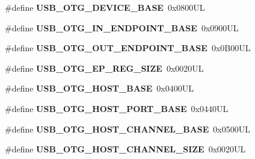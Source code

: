 \begin{DoxyCompactItemize}
\mbox{\label{group___peripheral__memory__map_ga4d74a337597a77b1fca978202b519a18}} 
\#define {\bfseries U\+S\+B\+\_\+\+O\+T\+G\+\_\+\+D\+E\+V\+I\+C\+E\+\_\+\+B\+A\+SE}~0x0800\+UL
\item 
\mbox{\label{group___peripheral__memory__map_gad8f69041452615aeb3948600e3882246}} 
\#define {\bfseries U\+S\+B\+\_\+\+O\+T\+G\+\_\+\+I\+N\+\_\+\+E\+N\+D\+P\+O\+I\+N\+T\+\_\+\+B\+A\+SE}~0x0900\+UL
\item 
\mbox{\label{group___peripheral__memory__map_gaf0e972b8f028ecf44a652029efbd4642}} 
\#define {\bfseries U\+S\+B\+\_\+\+O\+T\+G\+\_\+\+O\+U\+T\+\_\+\+E\+N\+D\+P\+O\+I\+N\+T\+\_\+\+B\+A\+SE}~0x0\+B00\+UL
\item 
\mbox{\label{group___peripheral__memory__map_ga6fdb7429ad88e2d69440d6ecc4f4199e}} 
\#define {\bfseries U\+S\+B\+\_\+\+O\+T\+G\+\_\+\+E\+P\+\_\+\+R\+E\+G\+\_\+\+S\+I\+ZE}~0x0020\+UL
\item 
\mbox{\label{group___peripheral__memory__map_ga3bb2dd6c82eefd8587b6146ba36ae071}} 
\#define {\bfseries U\+S\+B\+\_\+\+O\+T\+G\+\_\+\+H\+O\+S\+T\+\_\+\+B\+A\+SE}~0x0400\+UL
\item 
\mbox{\label{group___peripheral__memory__map_ga42f433cb79ca69f09972e690fda6737a}} 
\#define {\bfseries U\+S\+B\+\_\+\+O\+T\+G\+\_\+\+H\+O\+S\+T\+\_\+\+P\+O\+R\+T\+\_\+\+B\+A\+SE}~0x0440\+UL
\item 
\mbox{\label{group___peripheral__memory__map_ga942c8c5241b80fbcf638fea0fa18bebd}} 
\#define {\bfseries U\+S\+B\+\_\+\+O\+T\+G\+\_\+\+H\+O\+S\+T\+\_\+\+C\+H\+A\+N\+N\+E\+L\+\_\+\+B\+A\+SE}~0x0500\+UL
\item 
\mbox{\label{group___peripheral__memory__map_ga266cb1dbb50faf447f9c15d2ee93a522}} 
\#define {\bfseries U\+S\+B\+\_\+\+O\+T\+G\+\_\+\+H\+O\+S\+T\+\_\+\+C\+H\+A\+N\+N\+E\+L\+\_\+\+S\+I\+ZE}~0x0020\+UL
\item 
\mbox{\label{group___peripheral__memory__map_gaa9766975aca084c257730879568bc7cf}} 

\end{DoxyCompactItemize}
